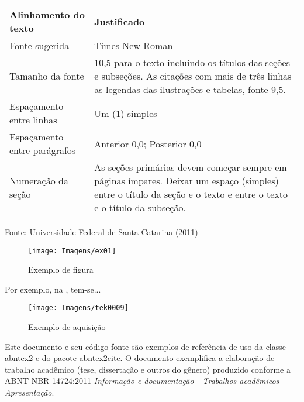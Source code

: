 \begin{table}[!htb]
\begin{center}
\begin{tabular}{ p{3cm} | p{6cm} }
			Alinhamento do texto           & Justificado                                                                                                                                                                        \\ \hline
			Fonte sugerida                 & Times New Roman                                                                                                                                                                    \\ \hline
			Tamanho da fonte               & 10,5 para o texto incluindo os títulos das seções e subseções. As citações com mais de três linhas as legendas das ilustrações e tabelas, fonte 9,5.                     \\ \hline
			Espaçamento entre linhas      & Um (1) simples                                                                                                                                                                     \\ \hline
			Espaçamento entre parágrafos & Anterior 0,0; Posterior 0,0                                                                                                                                                        \\ \hline
			Numeração da seção         & As seções  primárias devem  começar  sempre em páginas ímpares. Deixar um espaço (simples) entre o título da seção e o texto e  entre o texto e o título da subseção. \\  \hline
		\end{tabular}
	\end{center}
	Fonte: Universidade Federal de Santa Catarina (2011) \showfont
\end{table}


\begin{figure}
	\centering
	\caption{Exemplo de figura}
	\texttt{[image: Imagens/ex01]}
	\label{fig:ex01}
\end{figure}

Por exemplo, na , tem-se...


\begin{figure}
	\centering
	\texttt{[image: Imagens/tek0009]}
	\caption{Exemplo de aquisição}
	\label{fig:tek0009}
\end{figure}

Este documento e seu código-fonte são exemplos de referência de uso da classe
\textsf{abntex2} e do pacote \textsf{abntex2cite}. O documento
exemplifica a elaboração de trabalho acadêmico (tese, dissertação e outros do
gênero) produzido conforme a ABNT NBR 14724:2011 \emph{Informação e documentação
- Trabalhos acadêmicos - Apresentação}.

